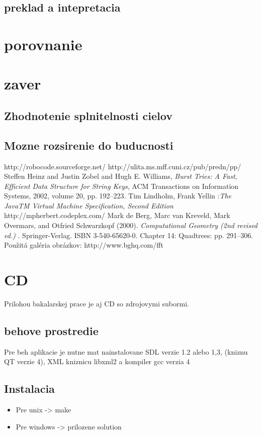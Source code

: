 \documentclass[12pt,notitlepage]{report}
\begin{document}
\section{preklad a intepretacia}
\chapter{porovnanie}
\chapter{zaver}
\section{Zhodnotenie splnitelnosti cielov}
\section{Mozne rozsirenie do buducnosti}
\tableofcontents
{}
\begin{thebibliography}{99}
 http://robocode.sourceforge.net/
 http://ulita.ms.mff.cuni.cz/pub/predn/pp/
Steffen Heinz and Justin Zobel and Hugh E. Williams,
    \emph{Burst Tries: A Fast, Efficient Data Structure for String Keys},
    ACM Transactions on Information Systems, 2002,
    volume 20, pp. 192--223.
 Tim Lindholm, Frank Yellin :\emph{The JavaTM Virtual Machine Specification, Second Edition}
http://mpherbert.codeplex.com/
   Mark de Berg, Marc van Kreveld, Mark Overmars, and Otfried Schwarzkopf (2000). \emph{ Computational Geometry (2nd revised ed.) }. Springer-Verlag. ISBN 3-540-65620-0.  Chapter 14: Quadtrees: pp. 291–306.
 Použitá galéria obrázkov: http://www.bghq.com/fft 
\end{thebibliography}
\appendix
\chapter{CD}
Prilohou bakalarskej prace je aj CD so zdrojovymi subormi.
\section{behove prostredie}
Pre beh aplikacie je nutne mat nainstalovane SDL verzie 1.2 alebo 1,3, (kniznu QT verzie 4), XML kniznicu libxml2 a kompiler gcc verzia 4
\section{Instalacia}
\begin{itemize}
\item Pre unix -> make
\item Pre windows -> prilozene solution
\end{itemize}
\end{document}
